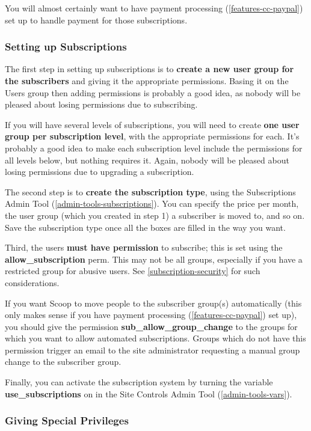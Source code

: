 You will almost certainly want to have payment processing (\ref{features-cc-paypal}) set up to handle payment for those subscriptions.

\subsubsection{Setting up Subscriptions}

The first step in setting up subscriptions is to {\bf create a new user group for the subscribers} and giving it the appropriate permissions.  Basing it on the Users group then adding permissions is probably a good idea, as nobody will be pleased about losing permissions due to subscribing.

If you will have several levels of subscriptions, you will need to create {\bf one user group per subscription level}, with the appropriate permissions for each.  It's probably a good idea to make each subscription level include the permissions for all levels below, but nothing requires it.  Again, nobody will be pleased about losing permissions due to upgrading a subscription.

The second step is to {\bf create the subscription type}, using the Subscriptions Admin Tool (\ref{admin-tools-subscriptions}).  You can specify the price per month, the user group (which you created in step 1) a subscriber is moved to, and so on.  Save the subscription type once all the boxes are filled in the way you want.

Third, the users {\bf must have permission} to subscribe; this is set using the {\bf allow\_subscription} perm.  This may not be all groups, especially if you have a restricted group for abusive users.  See \ref{subscription-security} for such considerations.

If you want Scoop to move people to the subscriber group(s) automatically (this only makes sense if you have payment processing (\ref{features-cc-paypal}) set up), you should give the permission {\bf sub\_allow\_group\_change} to the groups for which you want to allow automated subscriptions.  Groups which do not have this permission trigger an email to the site administrator requesting a manual group change to the subscriber group.

Finally, you can activate the subscription system by turning the variable {\bf use\_subscriptions} on in the Site Controls Admin Tool (\ref{admin-tools-vars}).

\subsubsection{Giving Special Privileges}

